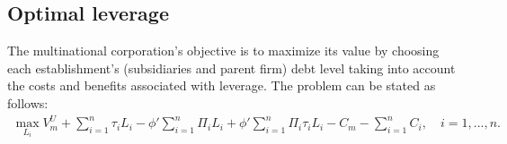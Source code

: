 \documentclass[12pt]{article}
\begin{document}
	\subsection{Optimal leverage}
	\label{subsec:opt_leverage}
	The multinational corporation's objective is to maximize its value by choosing each establishment's (subsidiaries and parent firm) debt level taking into account the costs and benefits associated with leverage. The problem can be stated as follows:
	\begin{equation}
	\begin{aligned}
	\max_{L_i}V_m^U+\sum_{i=1}^{n}\tau_iL_i-\phi'\sum_{i=1}^{n}\Pi_iL_i+\phi'\sum_{i=1}^{n}\Pi_i\tau_i L_i-C_m-\sum_{i=1}^{n}C_i, \quad i=1,...,n.
	\end{aligned}
	\label{eq:problem}
	\end{equation}
	
\end{document}
